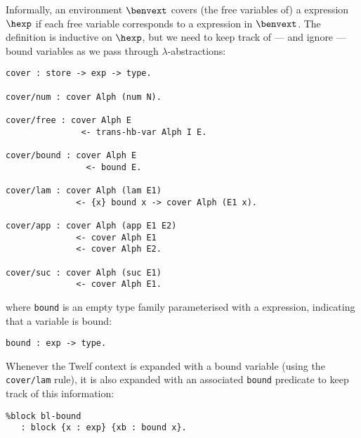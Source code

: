 Informally, an environment $\benvext$ covers (the free variables of) a \hlang expression $\hexp$ if each free variable corresponds to a \blang expression in $\benvext$.
The definition is inductive on $\hexp$, but we need to keep track of --- and ignore --- bound variables as we pass through $\lambda$-abstractions:
\begin{verbatim}
cover : store -> exp -> type.

cover/num : cover Alph (num N).

cover/free : cover Alph E
               <- trans-hb-var Alph I E.

cover/bound : cover Alph E
                <- bound E.

cover/lam : cover Alph (lam E1)
              <- {x} bound x -> cover Alph (E1 x).

cover/app : cover Alph (app E1 E2)
              <- cover Alph E1
              <- cover Alph E2.

cover/suc : cover Alph (suc E1)
              <- cover Alph E1.
\end{verbatim}
where \texttt{bound} is an empty type family parameterised with a \hlang expression, indicating that a variable is bound:
\begin{verbatim}
bound : exp -> type.
\end{verbatim}
Whenever the Twelf context is expanded with a bound variable (using the \texttt{cover/lam} rule), it is also expanded with an associated \texttt{bound} predicate to keep track of this information:
\begin{verbatim}
%block bl-bound
   : block {x : exp} {xb : bound x}.
\end{verbatim}

